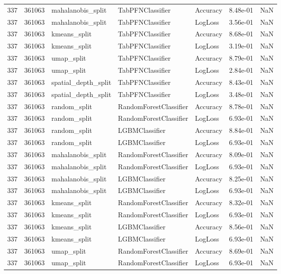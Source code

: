\begin{tabular}{rrlllrr}
337 & 361063 & mahalanobis\_split & TabPFNClassifier & Accuracy & 8.48e-01 & NaN \\
337 & 361063 & mahalanobis\_split & TabPFNClassifier & LogLoss & 3.56e-01 & NaN \\
337 & 361063 & kmeans\_split & TabPFNClassifier & Accuracy & 8.68e-01 & NaN \\
337 & 361063 & kmeans\_split & TabPFNClassifier & LogLoss & 3.19e-01 & NaN \\
337 & 361063 & umap\_split & TabPFNClassifier & Accuracy & 8.79e-01 & NaN \\
337 & 361063 & umap\_split & TabPFNClassifier & LogLoss & 2.84e-01 & NaN \\
337 & 361063 & spatial\_depth\_split & TabPFNClassifier & Accuracy & 8.43e-01 & NaN \\
337 & 361063 & spatial\_depth\_split & TabPFNClassifier & LogLoss & 3.48e-01 & NaN \\
337 & 361063 & random\_split & RandomForestClassifier & Accuracy & 8.78e-01 & NaN \\
337 & 361063 & random\_split & RandomForestClassifier & LogLoss & 6.93e-01 & NaN \\
337 & 361063 & random\_split & LGBMClassifier & Accuracy & 8.84e-01 & NaN \\
337 & 361063 & random\_split & LGBMClassifier & LogLoss & 6.93e-01 & NaN \\
337 & 361063 & mahalanobis\_split & RandomForestClassifier & Accuracy & 8.09e-01 & NaN \\
337 & 361063 & mahalanobis\_split & RandomForestClassifier & LogLoss & 6.93e-01 & NaN \\
337 & 361063 & mahalanobis\_split & LGBMClassifier & Accuracy & 8.25e-01 & NaN \\
337 & 361063 & mahalanobis\_split & LGBMClassifier & LogLoss & 6.93e-01 & NaN \\
337 & 361063 & kmeans\_split & RandomForestClassifier & Accuracy & 8.32e-01 & NaN \\
337 & 361063 & kmeans\_split & RandomForestClassifier & LogLoss & 6.93e-01 & NaN \\
337 & 361063 & kmeans\_split & LGBMClassifier & Accuracy & 8.56e-01 & NaN \\
337 & 361063 & kmeans\_split & LGBMClassifier & LogLoss & 6.93e-01 & NaN \\
337 & 361063 & umap\_split & RandomForestClassifier & Accuracy & 8.69e-01 & NaN \\
337 & 361063 & umap\_split & RandomForestClassifier & LogLoss & 6.93e-01 & NaN \\

\end{tabular}
